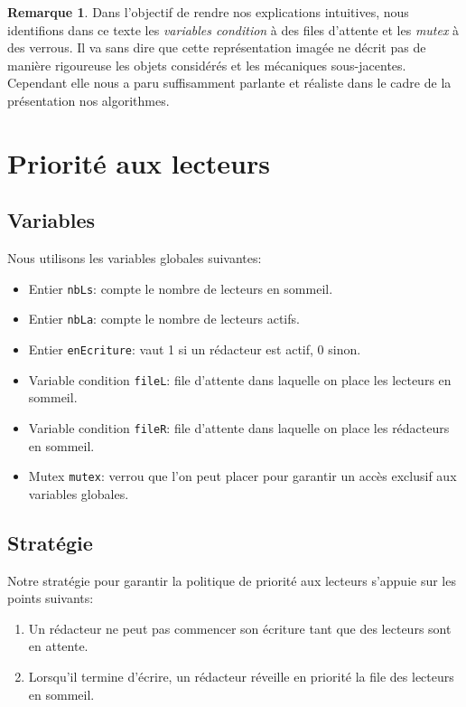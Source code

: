 \documentclass[11pt]{article}
\theoremstyle{definition}
\theoremstyle{definition}
\newtheorem*{myRem}{Remarque}
\begin{document}
\begin{myRem}
  Dans l'objectif de rendre nos explications intuitives, nous identifions dans ce texte les \textit{variables condition} à des files d'attente et les \textit{mutex}
  à des verrous. Il va sans dire que cette représentation imagée ne décrit pas de manière rigoureuse les objets considérés et les mécaniques sous-jacentes.
  Cependant elle nous a paru suffisamment parlante et réaliste dans le cadre de la présentation nos algorithmes.
\end{myRem}




\section{Priorité aux lecteurs}

\subsection{Variables}
Nous utilisons les variables globales suivantes:
\begin{itemize}
\item Entier \texttt{nbLs}: compte le nombre de lecteurs en sommeil.
\item Entier \texttt{nbLa}: compte le nombre de lecteurs actifs.
\item Entier \texttt{enEcriture}: vaut 1 si un rédacteur est actif, 0 sinon.
\item Variable condition \texttt{fileL}: file d'attente dans laquelle on place les lecteurs en sommeil.
\item Variable condition \texttt{fileR}: file d'attente dans laquelle on place les rédacteurs en sommeil.
\item Mutex \texttt{mutex}: verrou que l'on peut placer pour garantir un accès exclusif aux variables globales.
\end{itemize}

\subsection{Stratégie}
Notre stratégie pour garantir la politique de priorité aux lecteurs s'appuie sur les points suivants:
\begin{enumerate}
\item Un rédacteur ne peut pas commencer son écriture tant que des lecteurs sont en attente.
\item Lorsqu'il termine d'écrire, un rédacteur réveille en priorité la file des lecteurs en sommeil.
\end{enumerate}
\end{document}
